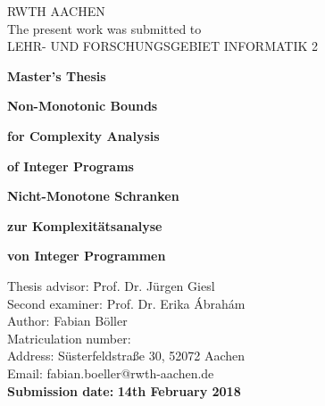 \thispagestyle{empty}

\begin{center}
  
  {\huge RWTH AACHEN\\[5mm]}
  The present work was submitted to \\
  LEHR- UND FORSCHUNGSGEBIET INFORMATIK 2\\
  
  \vspace*{2.5cm}
  
  {\huge \textbf{Master's Thesis}}\\ 
  
  \vspace{2.5cm}

  {\LARGE \textbf{Non-Monotonic Bounds}}\\ 

  \vspace*{3mm}

  {\LARGE \textbf{for Complexity Analysis}}\\ 

  \vspace*{3mm}

  {\LARGE \textbf{of Integer Programs}}\\

  \vspace{2cm}
  
  {\LARGE \textbf{Nicht-Monotone Schranken}}\\ 

  \vspace*{3mm}

  {\LARGE \textbf{zur Komplexitätsanalyse}}\\ 

  \vspace*{3mm}

  {\LARGE \textbf{von Integer Programmen}}\\
  
  \vspace{3cm}
  
  \parbox{120mm}{
    \begin{large}
      \begin{tabbing}
        Thesis advisor: \hspace{1.5cm} \= Prof. Dr. Jürgen Giesl\\
        Second examiner: \> Prof. Dr. Erika Ábrahám\\[1cm]
        Author:\> Fabian Böller\\ %
        Matriculation number:\\
        Address:\> Süsterfeldstraße 30, 52072 Aachen\\
        Email:\> fabian.boeller@rwth-aachen.de\\
        \textbf{Submission date:} \> \textbf{14th February 2018}\\
      \end{tabbing}
    \end{large}
  }
  
\end{center}
